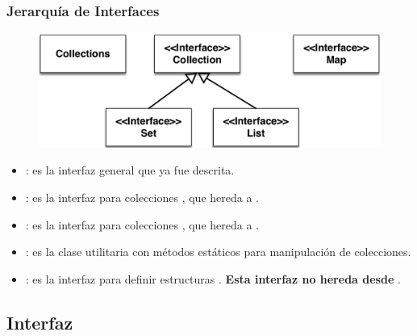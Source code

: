 \documentclass{beamer}
\begin{document}
\begin{frame}
  \frametitle{Jerarquía de Interfaces}

  \begin{figure}
    \centering
    \includegraphics[scale=0.5]{collections_hierarchy_1}
  \end{figure}

  \begin{small}
  \begin{itemize}
  \setlength\itemsep{0.2em}
  \item {}: es la interfaz general que ya fue
    descrita.
    
  \item {}: es la interfaz para colecciones , que
    hereda a .
    
  \item {}: es la interfaz para colecciones ,
    que hereda a .
    
  \item {}: es la clase utilitaria
     con métodos estáticos para
    manipulación de colecciones.

  \item {}: es la interfaz para definir estructuras
    . \textbf{Esta interfaz no hereda desde
      }.
    
  \end{itemize}
  \end{small}
  
\end{frame}

\subsection{Interfaz }
\end{document}
